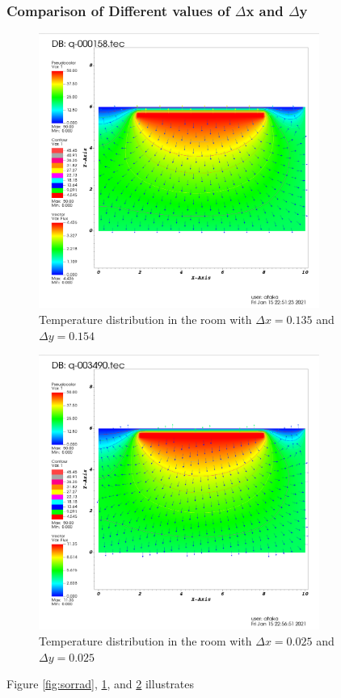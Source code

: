 \documentclass[letterpaper,12pt]{article}
\begin{document}
\subsubsection{Comparison of Different values of $\Delta$x and $\Delta$y}
\begin{figure}[H] 
	\centering 
	\includegraphics[max height=9cm]{graphs/imax75jmax40_default/imax75jmax40_default.png}
	\caption{Temperature distribution in the room with $\Delta x=0.135$ and $\Delta y = 0.154$}
 	\label{fig:7540}
\end{figure}
\begin{figure}[H] 
	\centering 
	\includegraphics[max height=9cm]{graphs/imax402jmax242_default/imax402jmax242_default.png}
	\caption{Temperature distribution in the room with $\Delta x=0.025$ and $\Delta y = 0.025$}
 	\label{fig:402242}
\end{figure}
Figure \ref{fig:sorrad}, \ref{fig:7540}, and \ref{fig:402242} illustrates 
\end{document}

